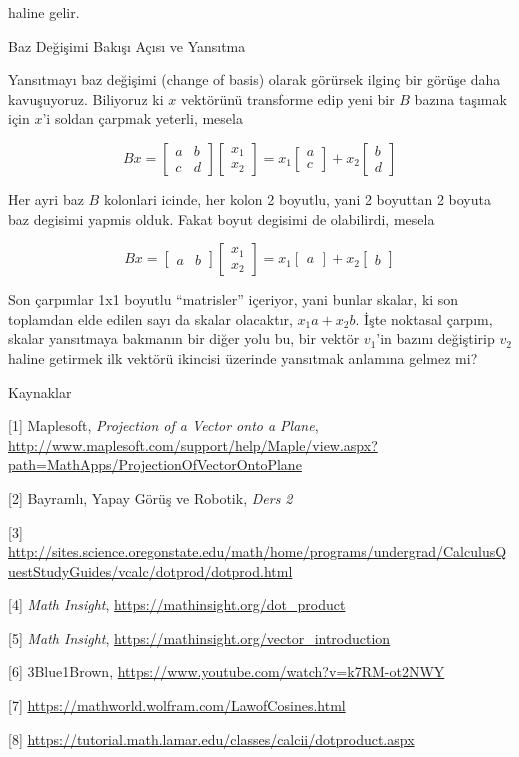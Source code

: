 \documentclass[12pt,fleqn]{article}\usepackage{../../common}
\begin{document}
haline gelir.

Baz Değişimi Bakışı Açısı ve Yansıtma

Yansıtmayı baz değişimi (change of basis) olarak görürsek ilginç bir görüşe daha
kavuşuyoruz. Biliyoruz ki $x$ vektörünü transforme edip yeni bir $B$ bazına
taşımak için $x$'i soldan çarpmak yeterli, mesela

$$
Bx = 
\left[\begin{array}{ccc}
a & b \\ c & d
\end{array}\right]
\left[\begin{array}{c}
x_1 \\ x_2
\end{array}\right] =
x_1 \left[\begin{array}{c}
a \\ c
\end{array}\right] +
x_2 \left[\begin{array}{c}
b \\ d
\end{array}\right]
$$

Her ayri baz $B$ kolonlari icinde, her kolon 2 boyutlu, yani 2 boyuttan 2 boyuta
baz degisimi yapmis olduk. Fakat boyut degisimi de olabilirdi, mesela 

$$
Bx = 
\left[\begin{array}{ccc}
a & b 
\end{array}\right]
\left[\begin{array}{c}
x_1 \\ x_2
\end{array}\right] =
x_1 \left[\begin{array}{c}
a 
\end{array}\right] +
x_2 \left[\begin{array}{c}
b 
\end{array}\right]
$$

Son çarpımlar 1x1 boyutlu ``matrisler'' içeriyor, yani bunlar skalar, ki son
toplamdan elde edilen sayı da skalar olacaktır, $x_1 a + x_2 b$. İşte noktasal
çarpım, skalar yansıtmaya bakmanın bir diğer yolu bu, bir vektör $v_1$'in bazını
değiştirip $v_2$ haline getirmek ilk vektörü ikincisi üzerinde yansıtmak
anlamına gelmez mi? 

Kaynaklar

[1] Maplesoft, {\em Projection of a Vector onto a Plane}, \url{http://www.maplesoft.com/support/help/Maple/view.aspx?path=MathApps/ProjectionOfVectorOntoPlane}

[2] Bayramlı, Yapay Görüş ve Robotik, {\em Ders 2}

[3] \url{http://sites.science.oregonstate.edu/math/home/programs/undergrad/CalculusQuestStudyGuides/vcalc/dotprod/dotprod.html}

[4] {\em Math Insight},
    \url{https://mathinsight.org/dot_product}

[5] {\em Math Insight},
    \url{https://mathinsight.org/vector_introduction}

[6] 3Blue1Brown, \url{https://www.youtube.com/watch?v=k7RM-ot2NWY}

[7] \url{https://mathworld.wolfram.com/LawofCosines.html}

[8] \url{https://tutorial.math.lamar.edu/classes/calcii/dotproduct.aspx}
\end{document}
